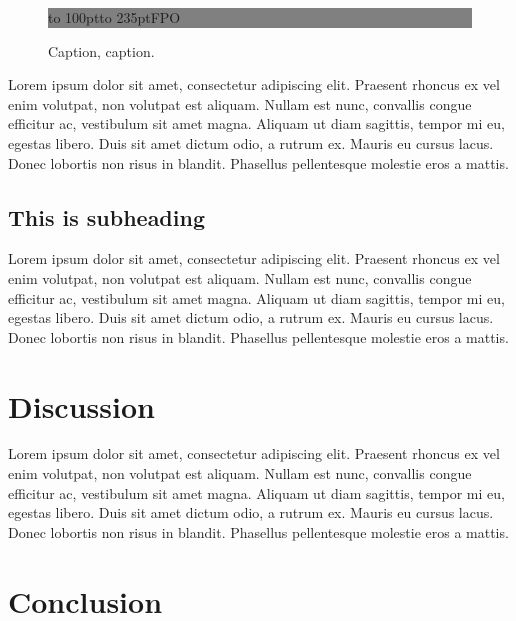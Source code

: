 \documentclass{bioinfo}
\begin{document}
\begin{figure}[!tpb]%
\fboxsep=0pt\colorbox{gray}{\begin{minipage}[t]{235pt} \vbox to 100pt{\vfill\hbox to
235pt{\hfill\fontsize{24pt}{24pt}\selectfont FPO\hfill}\vfill}
\end{minipage}}
\caption{Caption, caption.}\label{fig:01}
\end{figure}


Lorem ipsum dolor sit amet, consectetur adipiscing elit. Praesent 
rhoncus ex vel enim volutpat, non volutpat est aliquam. Nullam est 
nunc, convallis congue efficitur ac, vestibulum sit amet magna. 
Aliquam ut diam sagittis, tempor mi eu, egestas libero. Duis sit 
amet dictum odio, a rutrum ex. Mauris eu cursus lacus. Donec 
lobortis non risus in blandit. Phasellus pellentesque molestie 
eros a mattis. 

\subsection{This is subheading}

Lorem ipsum dolor sit amet, consectetur adipiscing elit. Praesent 
rhoncus ex vel enim volutpat, non volutpat est aliquam. Nullam est 
nunc, convallis congue efficitur ac, vestibulum sit amet magna. 
Aliquam ut diam sagittis, tempor mi eu, egestas libero. Duis sit 
amet dictum odio, a rutrum ex. Mauris eu cursus lacus. Donec 
lobortis non risus in blandit. Phasellus pellentesque molestie 
eros a mattis. 

\section{Discussion}

Lorem ipsum dolor sit amet, consectetur adipiscing elit. Praesent 
rhoncus ex vel enim volutpat, non volutpat est aliquam. Nullam est 
nunc, convallis congue efficitur ac, vestibulum sit amet magna. 
Aliquam ut diam sagittis, tempor mi eu, egestas libero. Duis sit 
amet dictum odio, a rutrum ex. Mauris eu cursus lacus. Donec 
lobortis non risus in blandit. Phasellus pellentesque molestie 
eros a mattis. 

\section{Conclusion}
\end{document}
